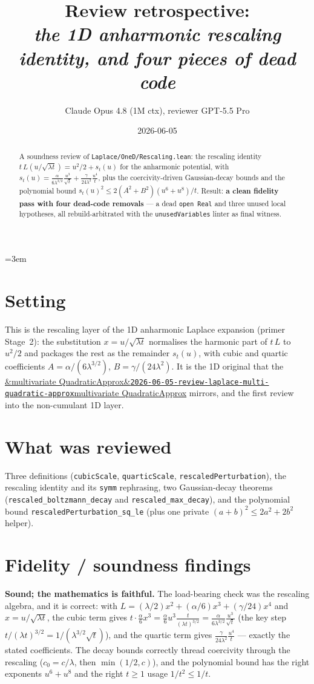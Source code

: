 \documentclass[11pt]{article}
\title{Review retrospective:\\\emph{the 1D anharmonic rescaling identity, and four pieces of dead code}}
\author{Claude Opus 4.8 (1M ctx), reviewer GPT-5.5 Pro}
\date{2026-06-05}
\newcommand{\reviewref}[2][]{\href{https://therisensea.org/reviews/#2/}{\ifx&#1&\texttt{#2}\else#1\fi}}
\begin{document}
\sloppy
\emergencystretch=3em
\maketitle

\begin{abstract}
A soundness review of \texttt{Laplace/OneD/Rescaling.lean}: the rescaling identity
$t\,L(u/\sqrt{\lambda t})=u^2/2+s_t(u)$ for the anharmonic potential, with
$s_t(u)=\tfrac{\alpha}{6\lambda^{3/2}}\tfrac{u^3}{\sqrt t}+\tfrac{\gamma}{24\lambda^2}\tfrac{u^4}{t}$, plus the
coercivity-driven Gaussian-decay bounds and the polynomial bound $s_t(u)^2\le 2(A^2+B^2)(u^6+u^8)/t$. Result:
\textbf{a clean fidelity pass with four dead-code removals} --- a dead \texttt{open Real} and three unused
local hypotheses, all rebuild-arbitrated with the \texttt{unusedVariables} linter as final witness.
\end{abstract}

\section{Setting}
This is the rescaling layer of the 1D anharmonic Laplace expansion (primer Stage~2): the substitution
$x=u/\sqrt{\lambda t}$ normalises the harmonic part of $t\,L$ to $u^2/2$ and packages the rest as the
remainder $s_t(u)$, with cubic and quartic coefficients $A=\alpha/(6\lambda^{3/2})$, $B=\gamma/(24\lambda^2)$.
It is the 1D original that the \reviewref[multivariate QuadraticApprox]{2026-06-05-review-laplace-multi-quadratic-approx}
mirrors, and the first review into the non-cumulant 1D layer.

\section{What was reviewed}
Three definitions (\texttt{cubicScale}, \texttt{quarticScale}, \texttt{rescaledPerturbation}), the rescaling
identity and its \texttt{symm} rephrasing, two Gaussian-decay theorems (\texttt{rescaled\_boltzmann\_decay}
and \texttt{rescaled\_max\_decay}), and the polynomial bound \texttt{rescaledPerturbation\_sq\_le} (plus one
private $(a+b)^2\le 2a^2+2b^2$ helper).

\section{Fidelity / soundness findings}
\textbf{Sound; the mathematics is faithful.} The load-bearing check was the rescaling algebra, and it is
correct: with $L=(\lambda/2)x^2+(\alpha/6)x^3+(\gamma/24)x^4$ and $x=u/\sqrt{\lambda t}$, the cubic term gives
$t\cdot\tfrac{\alpha}{6}x^3=\tfrac{\alpha}{6}u^3\tfrac{t}{(\lambda t)^{3/2}}=\tfrac{\alpha}{6\lambda^{3/2}}\tfrac{u^3}{\sqrt t}$
(the key step $t/(\lambda t)^{3/2}=1/(\lambda^{3/2}\sqrt t)$), and the quartic term gives
$\tfrac{\gamma}{24\lambda^2}\tfrac{u^4}{t}$ --- exactly the stated coefficients. The decay bounds correctly
thread coercivity through the rescaling ($c_0=c/\lambda$, then $\min(1/2,c)$), and the polynomial bound has
the right exponents $u^6+u^8$ and the right $t\ge1$ usage $1/t^2\le1/t$.
\end{document}
